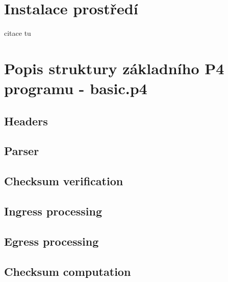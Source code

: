 \documentclass[czech, 11pt]{article}
\author{Boháčová Jana, Bc.; Keberle Ondřej, Bc.; Mlýnek Jakub, Bc.; Otava Michal, Bc.; Doubravský Ondřej, Bc.}
\begin{document}
	
	\tableofcontents %
	\clearpage
	
	\section{Instalace prostředí}
    
    citace tu \cite{p4vm}
	
	
	

    \newpage
    \section{Popis struktury základního P4 programu - basic.p4}
    \subsection{Headers}
    \subsection{Parser}
    \subsection{Checksum verification}
    \subsection{Ingress processing}
    \subsection{Egress processing}
    \subsection{Checksum computation}
\end{document}
